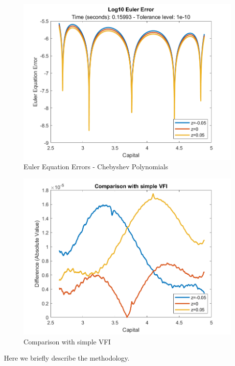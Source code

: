 \documentclass[a4paper,12pt]{article}
\begin{document}
   \begin{figure}[!htbp]
       \centering
       \includegraphics{econ714_homework2_question5_plot_eee.png}
       \caption{Euler Equation Errors - Chebyshev Polynomials}
       \label{EEE_chebyshev_pol}
   \end{figure}
   
  \begin{figure}[!htbp]
       \centering
       \includegraphics{econ714_homework2_question5_plot_comparison_q2.png}
       \caption{Comparison with simple VFI}
       \label{comparsion_with_VFI_q2}
   \end{figure}
   
   Here we briefly describe the methodology. 
   
\end{document}
